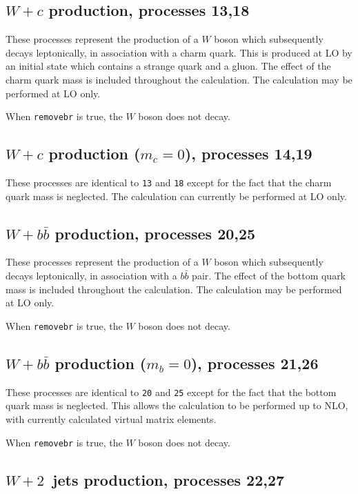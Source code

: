 \documentclass[12pt]{article}
\begin{document}
\subsection{$W+c$ production, processes 13,18}
\label{subsec:wc}

These processes represent the production of a $W$ boson which subsequently
decays leptonically, in association with a charm quark. This is produced at LO
by an initial state which contains a strange quark and a gluon. The effect of
the charm quark mass is included throughout the calculation.  
The calculation may be performed at LO only.

When {\tt removebr} is true, the $W$ boson does not decay.

\subsection{$W+c$ production ($m_c=0$), processes 14,19}
\label{subsec:wcmassless}

These processes are identical to {\tt 13} and {\tt 18} except for the fact
that the charm quark mass is neglected. The calculation can currently be
performed at LO only.

\subsection{$W+b{\bar b}$ production, processes 20,25}
\label{subsec:wbb}

These processes represent the production of a $W$ boson which subsequently
decays leptonically, in association with a $b{\bar b}$ pair. The effect of
the bottom quark mass is included throughout the calculation.  
The calculation may be performed at LO only.

When {\tt removebr} is true, the $W$ boson does not decay.

\subsection{$W+b{\bar b}$ production ($m_b=0$), processes 21,26}
\label{subsec:wbbmassless}

These processes are identical to {\tt 20} and {\tt 25} except for the fact
that the bottom quark mass is neglected. This allows the calculation to be
performed up to NLO, with currently calculated virtual matrix elements.

When {\tt removebr} is true, the $W$ boson does not decay.

\subsection{$W+2$~jets production, processes 22,27}
\label{subsec:w2jets}
\end{document}
